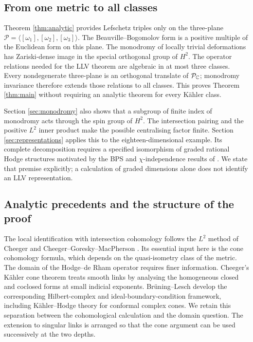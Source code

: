 \subsection{From one metric to all classes}
Theorem \ref{thm:analytic} provides Lefschetz triples only on the
three-plane
$\mathcal P=\langle[\omega_1],[\omega_2],[\omega_3]\rangle$.
The Beauville--Bogomolov form is a positive multiple of the Euclidean
form on this plane. The monodromy of locally trivial deformations
has Zariski-dense image in the special orthogonal group of $H^2$.
The operator relations needed for the LLV theorem are algebraic in
at most three classes. Every nondegenerate three-plane is an
orthogonal translate of $\mathcal P_{\mathbb C}$; monodromy invariance
therefore extends those relations to all classes. This proves
Theorem \ref{thm:main} without requiring an analytic theorem for
every K\"ahler class.

Section \ref{sec:monodromy} also shows that a subgroup of finite
index of monodromy acts through the spin group of $H^2$. The
intersection pairing and the positive $L^2$ inner product make the
possible centralising factor finite. Section
\ref{sec:representations} applies this to the eighteen-dimensional
example. Its complete decomposition requires a specified
isomorphism of graded rational Hodge structures motivated by the
BPS and $\chi$-independence results of
\cite{dhsm22,dhksv26,gwz26}. We state that premise explicitly; a
calculation of graded dimensions alone does not identify an LLV
representation.

\subsection{Analytic precedents and the structure of the proof}
The local identification with intersection cohomology follows the
$L^2$ method of Cheeger and Cheeger--Goresky--MacPherson
\cite{cheeger80,cgm82}. Its essential input here is the cone
cohomology formula, which depends on the quasi-isometry class of
the metric. The domain of the Hodge--de Rham operator requires
finer information. Cheeger's K\"ahler cone theorem
\cite{cheeger83} treats smooth links by analysing the homogeneous
closed and coclosed forms at small indicial exponents.
Br\"uning--Lesch \cite{brl92,brl93} develop the corresponding
Hilbert-complex and ideal-boundary-condition framework, including
K\"ahler--Hodge theory for conformal complex cones. We retain
this separation between the cohomological calculation and the
domain question. The extension to singular links is arranged so
that the cone argument can be used successively at the two depths.

